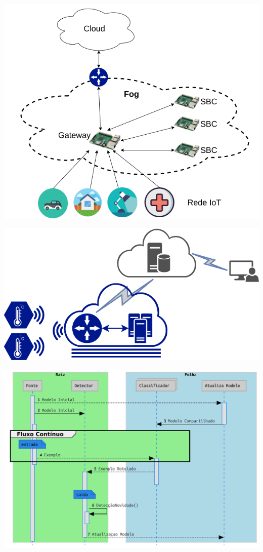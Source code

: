 \documentclass[aspectratio=1610,10pt]{beamer}
\newcommand{\fonte}[1]{\vspace{-1em}{\footnotesize\textbf{Fonte:} #1}}
\begin{document}
\begin{frame}\centering
  \includegraphics[width=0.8\linewidth]{figures/arq-mfog.png}
\end{frame}
\begin{frame}\centering
  \includegraphics[width=0.8\linewidth]{figures/mfog-arch-fisica.svg.pdf}
\end{frame}
\begin{frame}\centering
  \includegraphics[width=0.93\linewidth]{figures/lifecycle-uml-svg.pdf}
\end{frame}
\end{document}
